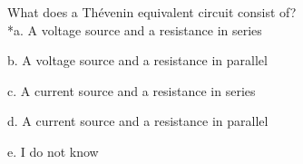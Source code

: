
What does a Thévenin equivalent circuit consist of? \\

*a. A voltage source and a resistance in series

b. A voltage source and a resistance in parallel

c. A current source and a resistance in series

d. A current source and a resistance in parallel

e. I do not know \\
